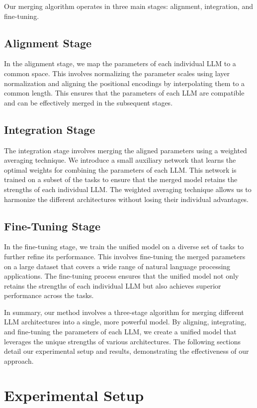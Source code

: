 \documentclass{article} %
\begin{document}
Our merging algorithm operates in three main stages: alignment, integration, and fine-tuning. 

\subsection{Alignment Stage}
In the alignment stage, we map the parameters of each individual LLM to a common space. This involves normalizing the parameter scales using layer normalization \citep{ba2016layer} and aligning the positional encodings by interpolating them to a common length. This ensures that the parameters of each LLM are compatible and can be effectively merged in the subsequent stages.

\subsection{Integration Stage}
The integration stage involves merging the aligned parameters using a weighted averaging technique. We introduce a small auxiliary network that learns the optimal weights for combining the parameters of each LLM. This network is trained on a subset of the tasks to ensure that the merged model retains the strengths of each individual LLM. The weighted averaging technique allows us to harmonize the different architectures without losing their individual advantages.

\subsection{Fine-Tuning Stage}
In the fine-tuning stage, we train the unified model on a diverse set of tasks to further refine its performance. This involves fine-tuning the merged parameters on a large dataset that covers a wide range of natural language processing applications. The fine-tuning process ensures that the unified model not only retains the strengths of each individual LLM but also achieves superior performance across the tasks.

In summary, our method involves a three-stage algorithm for merging different LLM architectures into a single, more powerful model. By aligning, integrating, and fine-tuning the parameters of each LLM, we create a unified model that leverages the unique strengths of various architectures. The following sections detail our experimental setup and results, demonstrating the effectiveness of our approach.

\section{Experimental Setup}
\label{sec:experimental}
\end{document}
